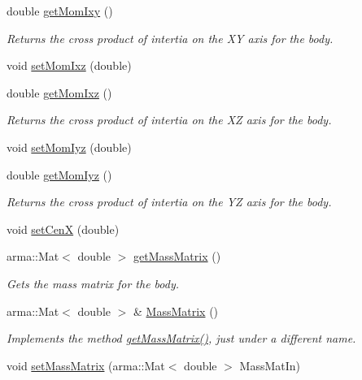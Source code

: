 \begin{DoxyCompactItemize}
double \hyperlink{classosea_1_1ofreq_1_1_body_a1acaae4a9731de146aabcb9482ff3f0b}{get\-Mom\-Ixy} ()
\begin{DoxyCompactList}\small\item\em Returns the cross product of intertia on the X\-Y axis for the body. \end{DoxyCompactList}\item 
void \hyperlink{classosea_1_1ofreq_1_1_body_ab76083304777794dd27769e1a35955b5}{set\-Mom\-Ixz} (double)
\item 
double \hyperlink{classosea_1_1ofreq_1_1_body_a946ad48ed4493008f4afbc5e89690bb5}{get\-Mom\-Ixz} ()
\begin{DoxyCompactList}\small\item\em Returns the cross product of intertia on the X\-Z axis for the body. \end{DoxyCompactList}\item 
void \hyperlink{classosea_1_1ofreq_1_1_body_a21a26c218ddbb7ee5b20e9ccdb0736f7}{set\-Mom\-Iyz} (double)
\item 
double \hyperlink{classosea_1_1ofreq_1_1_body_a5178058d29b5eaac87f21f26d5e935f6}{get\-Mom\-Iyz} ()
\begin{DoxyCompactList}\small\item\em Returns the cross product of intertia on the Y\-Z axis for the body. \end{DoxyCompactList}\item 
void \hyperlink{classosea_1_1ofreq_1_1_body_aeaacc5db3052196de8a6f7f61a8b6278}{set\-Cen\-X} (double)
\item 
arma\-::\-Mat$<$ double $>$ \hyperlink{classosea_1_1ofreq_1_1_body_a4201150aa57d9d6f3aa245d8eca231d3}{get\-Mass\-Matrix} ()
\begin{DoxyCompactList}\small\item\em Gets the mass matrix for the body. \end{DoxyCompactList}\item 
arma\-::\-Mat$<$ double $>$ \& \hyperlink{classosea_1_1ofreq_1_1_body_acb2895e81a595c7d168db48ff5dc766c}{Mass\-Matrix} ()
\begin{DoxyCompactList}\small\item\em Implements the method \hyperlink{classosea_1_1ofreq_1_1_body_a4201150aa57d9d6f3aa245d8eca231d3}{get\-Mass\-Matrix()}, just under a different name. \end{DoxyCompactList}\item 
void \hyperlink{classosea_1_1ofreq_1_1_body_a8c0801af29b02fa9890ad078368844e8}{set\-Mass\-Matrix} (arma\-::\-Mat$<$ double $>$ Mass\-Mat\-In)

\end{DoxyCompactItemize}
